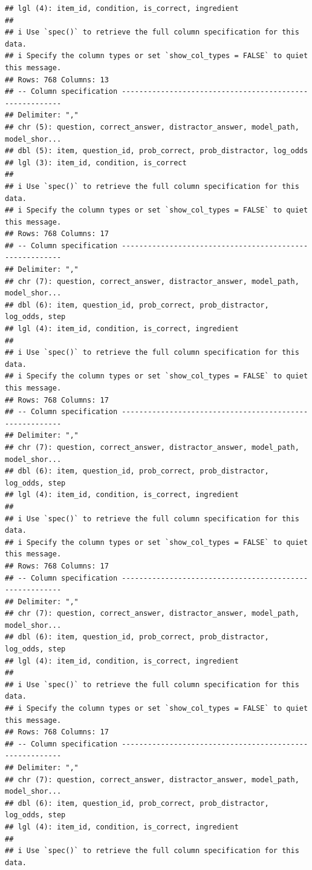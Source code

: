 \documentclass[
]{article}
\begin{document}
\begin{verbatim}
## lgl (4): item_id, condition, is_correct, ingredient
## 
## i Use `spec()` to retrieve the full column specification for this data.
## i Specify the column types or set `show_col_types = FALSE` to quiet this message.
## Rows: 768 Columns: 13
## -- Column specification --------------------------------------------------------
## Delimiter: ","
## chr (5): question, correct_answer, distractor_answer, model_path, model_shor...
## dbl (5): item, question_id, prob_correct, prob_distractor, log_odds
## lgl (3): item_id, condition, is_correct
## 
## i Use `spec()` to retrieve the full column specification for this data.
## i Specify the column types or set `show_col_types = FALSE` to quiet this message.
## Rows: 768 Columns: 17
## -- Column specification --------------------------------------------------------
## Delimiter: ","
## chr (7): question, correct_answer, distractor_answer, model_path, model_shor...
## dbl (6): item, question_id, prob_correct, prob_distractor, log_odds, step
## lgl (4): item_id, condition, is_correct, ingredient
## 
## i Use `spec()` to retrieve the full column specification for this data.
## i Specify the column types or set `show_col_types = FALSE` to quiet this message.
## Rows: 768 Columns: 17
## -- Column specification --------------------------------------------------------
## Delimiter: ","
## chr (7): question, correct_answer, distractor_answer, model_path, model_shor...
## dbl (6): item, question_id, prob_correct, prob_distractor, log_odds, step
## lgl (4): item_id, condition, is_correct, ingredient
## 
## i Use `spec()` to retrieve the full column specification for this data.
## i Specify the column types or set `show_col_types = FALSE` to quiet this message.
## Rows: 768 Columns: 17
## -- Column specification --------------------------------------------------------
## Delimiter: ","
## chr (7): question, correct_answer, distractor_answer, model_path, model_shor...
## dbl (6): item, question_id, prob_correct, prob_distractor, log_odds, step
## lgl (4): item_id, condition, is_correct, ingredient
## 
## i Use `spec()` to retrieve the full column specification for this data.
## i Specify the column types or set `show_col_types = FALSE` to quiet this message.
## Rows: 768 Columns: 17
## -- Column specification --------------------------------------------------------
## Delimiter: ","
## chr (7): question, correct_answer, distractor_answer, model_path, model_shor...
## dbl (6): item, question_id, prob_correct, prob_distractor, log_odds, step
## lgl (4): item_id, condition, is_correct, ingredient
## 
## i Use `spec()` to retrieve the full column specification for this data.

\end{verbatim}
\end{document}
